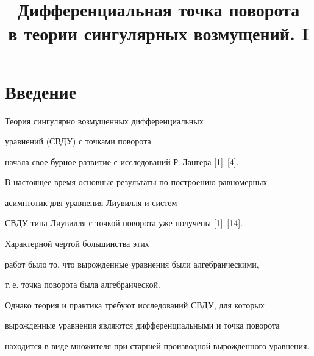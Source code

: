 

\title{Дифференциальная точка поворота\\


в теории сингулярных возмущений. I}





\date{}




\pagestyle{plain} %







\maketitle


\label{begin}








\section*{Введение}





Теория сингулярно возмущенных дифференциальных 


уравнений (СВДУ) с точками поворота


начала свое бурное развитие с исследований Р.\,Лангера [1]--[4].


В настоящее время основные результаты по построению равномерных 


асимптотик для уравнения Лиувилля и систем


СВДУ типа Лиувилля с точкой поворота уже получены [1]--[14]. 


Характерной чертой большинства этих


работ было то, что вырожденные уравнения были алгебраическими,


т.\,е. точка поворота была алгебраической.





Однако теория и практика требуют исследований СВДУ, для которых


вырожденные уравнения являются дифференциальными и точка поворота 


находится в виде множителя при старшей производной вырожденного уравнения.





